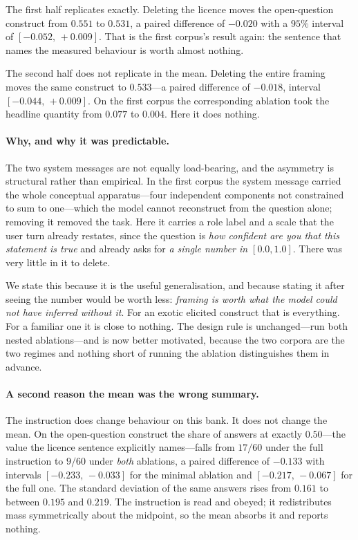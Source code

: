 The first half replicates exactly. Deleting the licence moves the open-question construct from
$0.551$ to $0.531$, a paired difference of $-0.020$ with a $95\%$ interval of
$[-0.052,\,+0.009]$. That is the first corpus's result again: the sentence that names the
measured behaviour is worth almost nothing.

The second half does not replicate in the mean. Deleting the entire framing moves the same construct
to $0.533$---a paired difference of $-0.018$, interval $[-0.044,\,+0.009]$. On the first corpus
the corresponding ablation took the headline quantity from $0.077$ to $0.004$. Here it does
nothing.

\paragraph{Why, and why it was predictable.} The two system messages are not equally load-bearing,
and the asymmetry is structural rather than empirical. In the first corpus the system message
carried the whole conceptual apparatus---four independent components not constrained to sum to
one---which the model cannot reconstruct from the question alone; removing it removed the task.
Here it carries a role label and a scale that the user turn already restates, since the question
is \emph{how confident are you that this statement is true} and already asks for \emph{a single
number in $[0.0, 1.0]$}. There was very little in it to delete.

We state this because it is the useful generalisation, and because stating it after seeing the
number would be worth less: \emph{framing is worth what the model could not have inferred without
it}. For an exotic elicited construct that is everything. For a familiar one it is close to
nothing. The design rule is unchanged---run both nested ablations---and is now better motivated,
because the two corpora are the two regimes and nothing short of running the ablation
distinguishes them in advance.

\paragraph{A second reason the mean was the wrong summary.} The instruction does change behaviour
on this bank. It does not change the mean. On the open-question construct the share of answers at
exactly $0.50$---the value the licence sentence explicitly names---falls from $17/60$ under the
full instruction to $9/60$ under \emph{both} ablations, a paired difference of $-0.133$ with
intervals $[-0.233,\,-0.033]$ for the minimal ablation and $[-0.217,\,-0.067]$ for the full one.
The standard deviation of the same answers rises from $0.161$ to between $0.195$ and $0.219$. The
instruction is read and obeyed; it redistributes mass symmetrically about the midpoint, so the
mean absorbs it and reports nothing.

